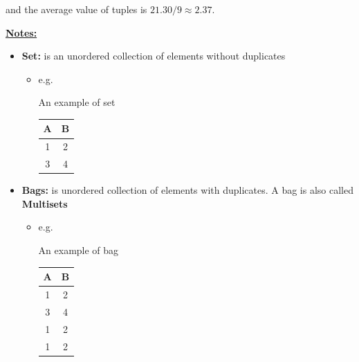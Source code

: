 \documentclass[12pt]{article}
\begin{document}
\begin{enumerate}
    \bigskip

    and the average value of tuples is $21.30/9 \approx 2.37$.

    \bigskip

    \underline{\textbf{Notes:}}

    \bigskip

    \begin{itemize}
        \item \textbf{Set:} is an unordered collection of elements without duplicates
        \begin{itemize}
            \item e.g.

            \bigskip

            An example of set

            \bigskip

            \begin{tabular}{|c|c|}
                \hline
                A   &   B\\
                \hline
                1   &   2\\
                \hline
                3   &   4\\
                \hline
            \end{tabular}
        \end{itemize}
        \item \textbf{Bags:} is unordered collection of elements with duplicates. A
        bag is also called \textbf{Multisets}
        \begin{itemize}
            \item e.g.

            \bigskip

            An example of bag

            \bigskip

            \begin{tabular}{|c|c|}
                \hline
                A   &   B\\
                \hline
                1   &   2\\
                \hline
                3   &   4\\
                \hline
                1   &   2\\
                \hline
                1   &   2\\
                \hline
            \end{tabular}
        \end{itemize}
    \end{itemize}


\end{enumerate}
\end{document}
